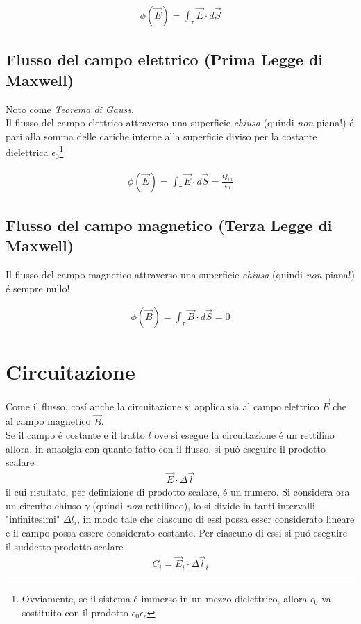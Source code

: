 \documentclass[17pt]{article}
\begin{document}
\begin{eqnarray}
	\phi(\vec{E}) = \int_{\tau}\vec{E}\cdot d\vec{S} 
\end{eqnarray}


\subsection{Flusso del campo elettrico (Prima Legge di Maxwell)}
Noto come \emph{Teorema di Gauss}.\\
Il flusso del campo elettrico attraverso una superficie \emph{chiusa} (quindi \emph{non} piana!) \'e pari alla somma delle cariche interne alla superficie diviso per la costante dielettrica $\epsilon_0$\footnote{Ovviamente, se il sistema \'e immerso in un mezzo dielettrico, allora $\epsilon_0$ va sostituito con il prodotto $\epsilon_0\epsilon_r$}


\begin{eqnarray}
	\phi(\vec{E}) = \int_{\tau}\vec{E}\cdot d\vec{S} = \frac{Q_{in}}{\epsilon_0}
\end{eqnarray}

\subsection{Flusso del campo magnetico (Terza Legge di Maxwell)}

Il flusso del campo magnetico attraverso una superficie \emph{chiusa} (quindi \emph{non} piana!) \'e sempre nullo!

\begin{eqnarray}
	\phi(\vec{B}) = \int_{\tau}\vec{B}\cdot d\vec{S} = 0
\end{eqnarray}


\section{Circuitazione}

Come il flusso, cos\'i anche la circuitazione si applica sia al campo elettrico $\vec{E}$ che al campo magnetico $\vec{B}$. \\
Se il campo \'e costante e il tratto $l$ ove si esegue la circuitazione \'e un rettilino allora, in anaolgia con quanto fatto con il flusso, si pu\'o eseguire il prodotto scalare
\begin{eqnarray}
	\vec{E}\cdot \Delta\vec{l}
\end{eqnarray}
il cui risultato, per definizione di prodotto scalare, \'e un numero. Si considera ora un circuito chiuso $\gamma$ (quindi \emph{non} rettilineo), lo si divide in tanti intervalli "infinitesimi" $\Delta l_i$, in modo tale che ciascuno di essi possa esser considerato lineare e il campo possa essere considerato costante. Per ciascuno di essi si pu\'o eseguire il suddetto prodotto scalare 
\begin{eqnarray}
	C_i = \vec{E}_i\cdot\Delta \vec{l}_i
\end{eqnarray}
 
\end{document}
